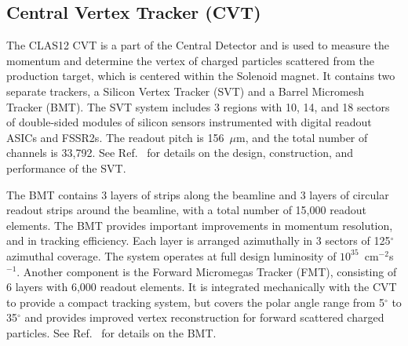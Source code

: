 \documentclass[final,3p,twocolumn]{elsarticle}
\begin{document}
\subsection{Central Vertex Tracker (CVT)}

The CLAS12 CVT is a part of the Central Detector and is used to measure the momentum and determine the vertex of
charged particles scattered from the production target, which is centered within the Solenoid magnet. It contains two
separate trackers, a Silicon Vertex Tracker (SVT) and a Barrel Micromesh Tracker  (BMT). The SVT system includes
3 regions with 10, 14, and 18 sectors of double-sided modules of silicon sensors instrumented with digital readout ASICs
and FSSR2s. The readout pitch is 156~$\mu$m, and the total number of channels is 33,792. See Ref.~\cite{SVT} for
details on the design, construction, and performance of the SVT.

The BMT contains 3 layers of strips along the beamline and 3 layers of circular readout strips around the beamline, with
a total number of 15,000 readout elements. The BMT provides important improvements in momentum resolution, and in
tracking efficiency. Each layer is arranged azimuthally in 3 sectors of 125$^\circ$ azimuthal coverage. The system
operates at full design luminosity of $10^{35}$~cm$^{-2}$s$^{-1}$. Another component is the Forward Micromegas Tracker
(FMT), consisting of 6 layers with 6,000 readout elements. It  is integrated mechanically with the CVT to provide a compact
tracking system, but covers the polar angle range from 5$^\circ$ to 35$^\circ$ and provides improved vertex reconstruction
for forward scattered charged particles. See Ref.~\cite{BMT} for details on the BMT.
\end{document}
